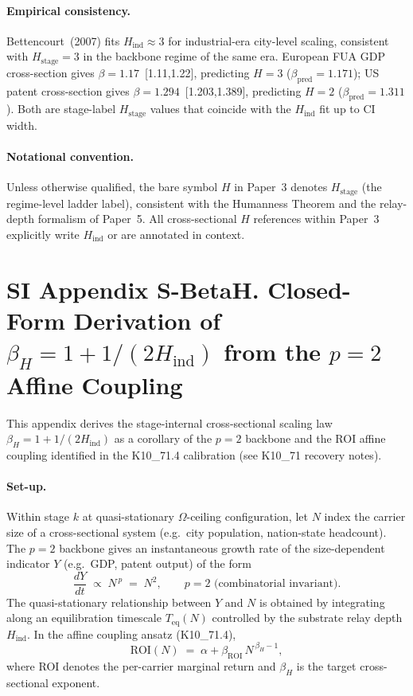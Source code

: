 \documentclass[11pt]{article}
\begin{document}
\paragraph{Empirical consistency.} Bettencourt~(2007) fits $H_{\mathrm{ind}}\approx 3$ for industrial-era city-level scaling, consistent with $H_{\mathrm{stage}}=3$ in the backbone regime of the same era.  European FUA GDP cross-section gives $\beta=1.17$~[1.11,1.22], predicting $H=3$ ($\beta_{\mathrm{pred}}=1.171$); US patent cross-section gives $\beta=1.294$~[1.203,1.389], predicting $H=2$ ($\beta_{\mathrm{pred}}=1.311$).  Both are stage-label $H_{\mathrm{stage}}$ values that coincide with the $H_{\mathrm{ind}}$ fit up to CI width.

\paragraph{Notational convention.} Unless otherwise qualified, the bare symbol $H$ in Paper~3 denotes $H_{\mathrm{stage}}$ (the regime-level ladder label), consistent with the Humanness Theorem and the relay-depth formalism of Paper~5.  All cross-sectional $H$ references within Paper~3 explicitly write $H_{\mathrm{ind}}$ or are annotated in context.

\section*{SI Appendix S-BetaH. Closed-Form Derivation of $\beta_H=1+1/(2H_{\mathrm{ind}})$ from the $p=2$ Affine Coupling}

This appendix derives the stage-internal cross-sectional scaling law $\beta_H = 1 + 1/(2 H_{\mathrm{ind}})$ as a corollary of the $p=2$ backbone and the ROI affine coupling identified in the K10\_71.4 calibration (see K10\_71 recovery notes).

\paragraph{Set-up.} Within stage $k$ at quasi-stationary $\Omega$-ceiling configuration, let $N$ index the carrier size of a cross-sectional system (e.g.\ city population, nation-state headcount).  The $p=2$ backbone gives an instantaneous growth rate of the size-dependent indicator $Y$ (e.g.\ GDP, patent output) of the form
\begin{equation}
\frac{dY}{dt} \;\propto\; N^{\,p} \;=\; N^2, \qquad p=2 \text{ (combinatorial invariant)}.
\label{eq:S-BetaH-dYdt}
\end{equation}
The quasi-stationary relationship between $Y$ and $N$ is obtained by integrating along an equilibration timescale $T_{\mathrm{eq}}(N)$ controlled by the substrate relay depth $H_{\mathrm{ind}}$.  In the affine coupling ansatz (K10\_71.4),
\begin{equation}
\mathrm{ROI}(N) \;=\; \alpha + \beta_{\mathrm{ROI}}\,N^{\,\beta_H - 1},
\label{eq:S-BetaH-ROI}
\end{equation}
where ROI denotes the per-carrier marginal return and $\beta_H$ is the target cross-sectional exponent.
\end{document}
